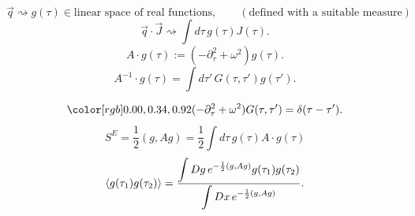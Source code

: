 \[
\vec q\rightsquigarrow
g(\tau)\in\text{linear space of real functions},
\qquad
(\text{defined with a suitable measure})
\]
\[
\vec q\cdot\vec J\rightsquigarrow
\int d\tau\,g(\tau)J(\tau).
\]
\[
A\cdot g(\tau):=(-\partial_\tau^2+\omega^2)g(\tau).
\]
\[
A^{-1}\cdot g(\tau)
=\int d\tau'\,G(\tau,\tau')g(\tau').
\]
\begin{center}
\end{center}
\[
\YinBlue{(-\partial_\tau^2+\omega^2)G(\tau,\tau')
=\delta(\tau-\tau').}
\]
\[
S^E=\frac{1}{2}(g,Ag)
=\frac{1}{2}\int d\tau\,g(\tau)A\cdot g(\tau)
\]
\[
\left\langle g(\tau_1)g(\tau_2)\right\rangle
=
\frac{%
\displaystyle\int Dg\,e^{-\frac{1}{2}(g,Ag)}
g(\tau_1)g(\tau_2)}{%
\displaystyle\int Dx\,e^{-\frac{1}{2}(g,Ag)}}.
\]



